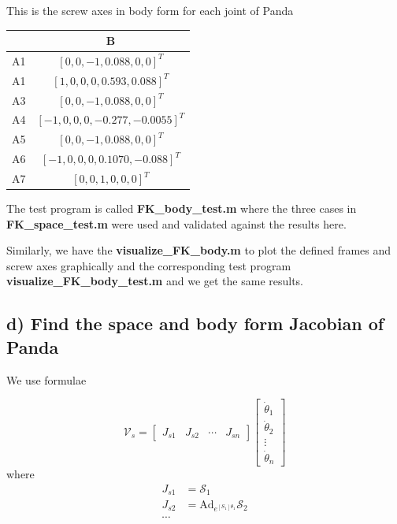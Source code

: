 \documentclass[english,10pt,a4paper]{article}
\begin{document}
    This is the screw axes in body form for each joint of Panda
    \begin{center}
        \begin{tabular}{|c|c|}
            \hline
            &  B \\
            \hline
            A1 & $[0, 0, -1, 0.088, 0, 0]^{T}$ \\
            \hline
            A1 & $[1, 0, 0, 0, 0.593, 0.088]^{T}$ \\
            \hline
            A3 & $[0, 0, -1, 0.088, 0, 0]^{T}$ \\
            \hline
            A4 & $[-1, 0, 0, 0, -0.277, -0.0055]^{T}$ \\
            \hline
            A5 & $[0, 0, -1, 0.088, 0, 0]^{T}$  \\
            \hline
            A6 & $[-1, 0, 0, 0, 0.1070, -0.088]^{T}$  \\
            \hline
            A7 & $[0, 0, 1, 0, 0, 0]^{T}$ \\
            \hline
        \end{tabular}
    \end{center}
	
    The test program is called \textbf{FK\_body\_test.m} where the three cases in \textbf{FK\_space\_test.m} were used and validated against the results here.
    
    Similarly, we have the \textbf{visualize\_FK\_body.m} to plot the defined frames and screw axes graphically and the corresponding test program \textbf{visualize\_FK\_body\_test.m} and we get the same results.
    
    \subsection*{d) Find the space and body form Jacobian of Panda}
    We use formulae

    $$\mathcal{V}_s = \begin{bmatrix}
    J_{s1} & J_{s2} & \cdots & J_{sn} 
\end{bmatrix}  \begin{bmatrix}
\dot{\theta}_1 \\ \dot{\theta}_2 \\ \vdots \\ \dot{\theta}_n
\end{bmatrix}$$
    where 
\begin{align*}
    J_{s1} &= \mathcal{S}_1 \\
    J_{s2} &= \text{Ad}_{e^{[S_1]\theta_1}} \mathcal{S}_2 \\
    \cdots
\end{align*}
\end{document}
